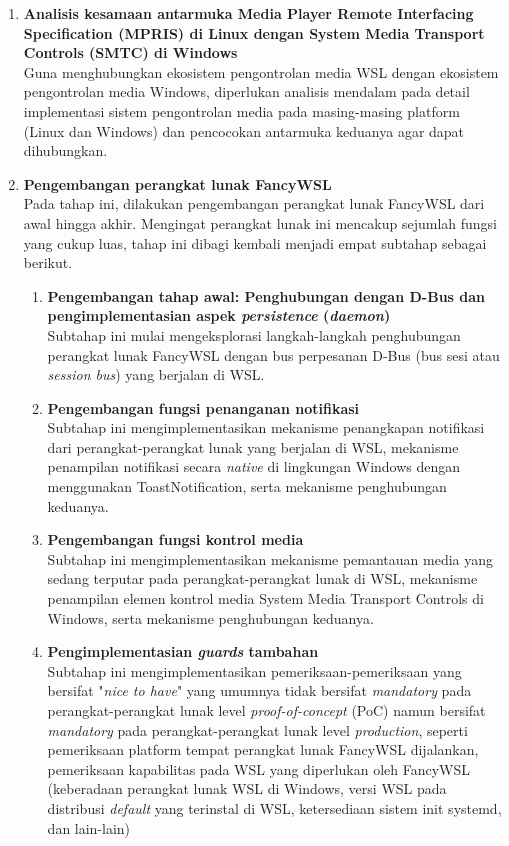 \begin{enumerate}
    \item \textbf{Analisis kesamaan antarmuka Media Player Remote Interfacing Specification (MPRIS) di Linux dengan System Media Transport Controls (SMTC) di Windows}\\
    Guna menghubungkan ekosistem pengontrolan media WSL dengan ekosistem pengontrolan media Windows, diperlukan analisis mendalam pada detail implementasi sistem pengontrolan media pada masing-masing platform (Linux dan Windows) dan pencocokan antarmuka keduanya agar dapat dihubungkan.

    \item \textbf{Pengembangan perangkat lunak FancyWSL}\\
    Pada tahap ini, dilakukan pengembangan perangkat lunak FancyWSL dari awal hingga akhir. Mengingat perangkat lunak ini mencakup sejumlah fungsi yang cukup luas, tahap ini dibagi kembali menjadi empat subtahap sebagai berikut.
    \begin{enumerate}
        \item \textbf{Pengembangan tahap awal: Penghubungan dengan D-Bus dan pengimplementasian aspek \textit{persistence} (\textit{daemon})}\\
        Subtahap ini mulai mengeksplorasi langkah-langkah penghubungan perangkat lunak FancyWSL dengan bus perpesanan D-Bus (bus sesi atau \textit{session bus}) yang berjalan di WSL.
        
        \item \textbf{Pengembangan fungsi penanganan notifikasi}\\
        Subtahap ini mengimplementasikan mekanisme penangkapan notifikasi dari perangkat-perangkat lunak yang berjalan di WSL, mekanisme penampilan notifikasi secara \textit{native} di lingkungan Windows dengan menggunakan ToastNotification, serta mekanisme penghubungan keduanya.

        \item \textbf{Pengembangan fungsi kontrol media}\\
        Subtahap ini mengimplementasikan mekanisme pemantauan media yang sedang terputar pada perangkat-perangkat lunak di WSL, mekanisme penampilan elemen kontrol media System Media Transport Controls di Windows, serta mekanisme penghubungan keduanya.

        \item \textbf{Pengimplementasian \textit{guards} tambahan}\\
        Subtahap ini mengimplementasikan pemeriksaan-pemeriksaan yang bersifat "\textit{nice to have}" yang umumnya tidak bersifat \textit{mandatory} pada perangkat-perangkat lunak level \textit{proof-of-concept} (PoC) namun bersifat \textit{mandatory} pada perangkat-perangkat lunak level \textit{production}, seperti pemeriksaan platform tempat perangkat lunak FancyWSL dijalankan, pemeriksaan kapabilitas pada WSL yang diperlukan oleh FancyWSL (keberadaan perangkat lunak WSL di Windows, versi WSL pada distribusi \textit{default} yang terinstal di WSL, ketersediaan sistem init systemd, dan lain-lain)
    \end{enumerate}
\end{enumerate}

